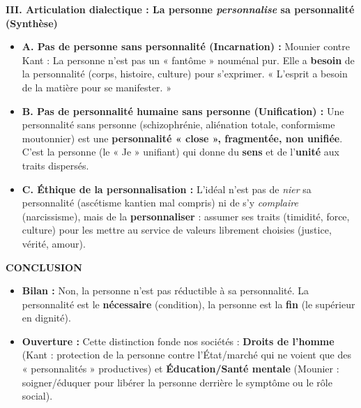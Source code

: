 \documentclass[11pt]{article}
\begin{document}
\begin{exoresolu}
\textbf{III. Articulation dialectique : La personne \emph{personnalise} sa personnalité (Synthèse)}
\begin{itemize}
    \item \textbf{A. Pas de personne sans personnalité (Incarnation) :} Mounier contre Kant : La personne n'est pas un « fantôme » nouménal pur. Elle a \textbf{besoin} de la personnalité (corps, histoire, culture) pour s'exprimer. « L'esprit a besoin de la matière pour se manifester. »
    \item \textbf{B. Pas de personnalité humaine sans personne (Unification) :} Une personnalité sans personne (schizophrénie, aliénation totale, conformisme moutonnier) est une \textbf{personnalité « close », fragmentée, non unifiée}. C'est la personne (le « Je » unifiant) qui donne du \textbf{sens} et de l'\textbf{unité} aux traits dispersés.
    \item \textbf{C. Éthique de la personnalisation :} L'idéal n'est pas de \emph{nier} sa personnalité (ascétisme kantien mal compris) ni de s'y \emph{complaire} (narcissisme), mais de la \textbf{personnaliser} : assumer ses traits (timidité, force, culture) pour les mettre au service de valeurs librement choisies (justice, vérité, amour).
\end{itemize}

\textbf{CONCLUSION}
\begin{itemize}
    \item \textbf{Bilan :} Non, la personne n'est pas réductible à sa personnalité. La personnalité est le \textbf{nécessaire} (condition), la personne est la \textbf{fin} (le supérieur en dignité).
    \item \textbf{Ouverture :} Cette distinction fonde nos sociétés : \textbf{Droits de l'homme} (Kant : protection de la personne contre l'État/marché qui ne voient que des « personnalités » productives) et \textbf{Éducation/Santé mentale} (Mounier : soigner/éduquer pour libérer la personne derrière le symptôme ou le rôle social).
\end{itemize}
\end{exoresolu}
\end{document}
